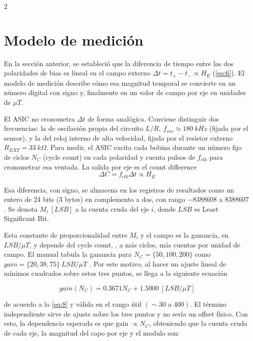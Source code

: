 \documentclass[11pt,letterpaper]{article}
\begin{document}
\begin{multicols*}{2}
\section{Modelo de medición}

En la sección anterior, se estableció que la diferencia de tiempo entre las dos polaridades de bias es lineal en el campo externo $\Delta t = t_+ - t_- \propto H_E$ (\cref{eq:6}). El modelo de medición describe cómo esa magnitud temporal se convierte en un número digital con signo y, finalmente en un valor de campo por eje en unidades de $\mu T$. 

El ASIC no cronometra $\Delta t$ de forma analógica. Conviene distinguir dos frecuencias: la de oscilación propia del circuito $L/R, \ f_{osc} \approx 180\ kHz$ (fijada por el sensor), y la del reloj interno de alta velocidad, fijada por el resistor externo $R_{EXT} = 33\ k\Omega$. Para medir, el ASIC excita cada bobina durante un número fijo de ciclos $N_C$ (cycle count) en cada polaridad y cuenta pulsos de $f_{clk}$ para cronometrar esa ventada. La salida por eje es el count difference
\begin{equation*}
    \Delta C = f_{clk} \Delta t \propto H_E
\end{equation*}

Esa diferencia, con signo, se almacena en los registros de resultados como un entero de 24 bits (3 bytes) en complemento a dos, con rango $-8388608$ a $8388607$ \citep{pni_manual}. Se denota $M_i \ [LSB]$ a la cuenta cruda del eje $i$, donde $LSB$ es Least Significant Bit.

Esta constante de proporcionalidad entre $M_i$ y el campo es la ganancia, en $LSB/\mu T$, y depende del cycle count, , a más ciclos, más cuentas por unidad de campo. El manual tabula la ganancia para $N_C = \{50, 100, 200\}$ como $gain = \{20, 38, 75\}\ LSB/\mu T$ \citep{pni_manual}. Por este motivo, al hacer un ajuste lineal de mínimos cuadrados sobre estos tres puntos, se llega a la siguiente ecuación

\begin{equation}
    gain(N_C) = 0.3671N_C + 1.5000 \ [LSB/\mu T]
    \label{eq:8}
\end{equation}

de acuerdo a la \cref{eq:8} y válida en el rango útil $(\sim 30\text{ a } 400)$. El término independiente sirve de ajuste sobre los tres puntos y no sería un offset físico. Con esto, la dependencia esperada es que $\text{gain } \propto N_C$, obteniendo que la cuenta cruda de cada eje, la magnitud del capo por eje y el modulo son:


\end{multicols*}
\end{document}
